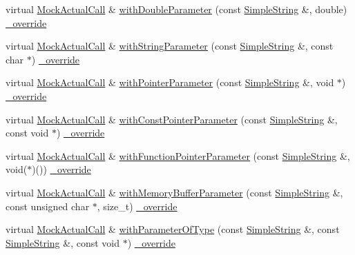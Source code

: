 \begin{DoxyCompactItemize}
\item 
virtual \hyperlink{class_mock_actual_call}{Mock\+Actual\+Call} \& \hyperlink{class_mock_ignored_actual_call_ac73d717480d217221ceccc2140ef237f}{with\+Double\+Parameter} (const \hyperlink{class_simple_string}{Simple\+String} \&, double) \hyperlink{_cpp_u_test_config_8h_a049bea15dd750e15869863c94c1efc3b}{\+\_\+override}
\item 
virtual \hyperlink{class_mock_actual_call}{Mock\+Actual\+Call} \& \hyperlink{class_mock_ignored_actual_call_ab947ba965972dd45a7f31e3e8dedb0f0}{with\+String\+Parameter} (const \hyperlink{class_simple_string}{Simple\+String} \&, const char $\ast$) \hyperlink{_cpp_u_test_config_8h_a049bea15dd750e15869863c94c1efc3b}{\+\_\+override}
\item 
virtual \hyperlink{class_mock_actual_call}{Mock\+Actual\+Call} \& \hyperlink{class_mock_ignored_actual_call_a76d14a81636c9b876ab3852399e816d0}{with\+Pointer\+Parameter} (const \hyperlink{class_simple_string}{Simple\+String} \&, void $\ast$) \hyperlink{_cpp_u_test_config_8h_a049bea15dd750e15869863c94c1efc3b}{\+\_\+override}
\item 
virtual \hyperlink{class_mock_actual_call}{Mock\+Actual\+Call} \& \hyperlink{class_mock_ignored_actual_call_ad020e59cdba9e1e31363c737c468e89a}{with\+Const\+Pointer\+Parameter} (const \hyperlink{class_simple_string}{Simple\+String} \&, const void $\ast$) \hyperlink{_cpp_u_test_config_8h_a049bea15dd750e15869863c94c1efc3b}{\+\_\+override}
\item 
virtual \hyperlink{class_mock_actual_call}{Mock\+Actual\+Call} \& \hyperlink{class_mock_ignored_actual_call_a0bc47db5960d4f9aa2f5dfad5025c100}{with\+Function\+Pointer\+Parameter} (const \hyperlink{class_simple_string}{Simple\+String} \&, void($\ast$)()) \hyperlink{_cpp_u_test_config_8h_a049bea15dd750e15869863c94c1efc3b}{\+\_\+override}
\item 
virtual \hyperlink{class_mock_actual_call}{Mock\+Actual\+Call} \& \hyperlink{class_mock_ignored_actual_call_aa520ee670c8837319946e235c614716c}{with\+Memory\+Buffer\+Parameter} (const \hyperlink{class_simple_string}{Simple\+String} \&, const unsigned char $\ast$, size\+\_\+t) \hyperlink{_cpp_u_test_config_8h_a049bea15dd750e15869863c94c1efc3b}{\+\_\+override}
\item 
virtual \hyperlink{class_mock_actual_call}{Mock\+Actual\+Call} \& \hyperlink{class_mock_ignored_actual_call_a07dadb36ec7fa79c8e930a75689a573a}{with\+Parameter\+Of\+Type} (const \hyperlink{class_simple_string}{Simple\+String} \&, const \hyperlink{class_simple_string}{Simple\+String} \&, const void $\ast$) \hyperlink{_cpp_u_test_config_8h_a049bea15dd750e15869863c94c1efc3b}{\+\_\+override}

\end{DoxyCompactItemize}
